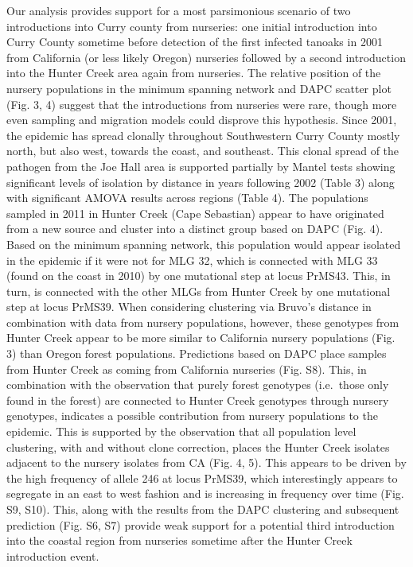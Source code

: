 \documentclass[double,12pt]{beavtex}
\begin{document}
  Our analysis provides support for a most parsimonious scenario of two
  introductions into Curry county from nurseries: one initial introduction
  into Curry County sometime before detection of the first infected
  tanoaks in 2001 from California (or less likely Oregon) nurseries
  followed by a second introduction into the Hunter Creek area again from
  nurseries. The relative position of the nursery populations in the
  minimum spanning network and DAPC scatter plot (Fig. 3, 4) suggest that
  the introductions from nurseries were rare, though more even sampling
  and migration models could disprove this hypothesis. Since 2001, the
  epidemic has spread clonally throughout Southwestern Curry County mostly
  north, but also west, towards the coast, and southeast. This clonal
  spread of the pathogen from the Joe Hall area is supported partially by
  Mantel tests showing significant levels of isolation by distance in
  years following 2002 (Table 3) along with significant AMOVA results
  across regions (Table 4). The populations sampled in 2011 in Hunter
  Creek (Cape Sebastian) appear to have originated from a new source and
  cluster into a distinct group based on DAPC (Fig. 4). Based on the
  minimum spanning network, this population would appear isolated in the
  epidemic if it were not for MLG 32, which is connected with MLG 33
  (found on the coast in 2010) by one mutational step at locus PrMS43.
  This, in turn, is connected with the other MLGs from Hunter Creek by one
  mutational step at locus PrMS39. When considering clustering via Bruvo's
  distance in combination with data from nursery populations, however,
  these genotypes from Hunter Creek appear to be more similar to
  California nursery populations (Fig. 3) than Oregon forest populations.
  Predictions based on DAPC place samples from Hunter Creek as coming from
  California nurseries (Fig. S8). This, in combination with the
  observation that purely forest genotypes (i.e.~those only found in the
  forest) are connected to Hunter Creek genotypes through nursery
  genotypes, indicates a possible contribution from nursery populations to
  the epidemic. This is supported by the observation that all population
  level clustering, with and without clone correction, places the Hunter
  Creek isolates adjacent to the nursery isolates from CA (Fig. 4, 5).
  This appears to be driven by the high frequency of allele 246 at locus
  PrMS39, which interestingly appears to segregate in an east to west
  fashion and is increasing in frequency over time (Fig. S9, S10). This,
  along with the results from the DAPC clustering and subsequent
  prediction (Fig. S6, S7) provide weak support for a potential third
  introduction into the coastal region from nurseries sometime after the
  Hunter Creek introduction event.
  
\end{document}
